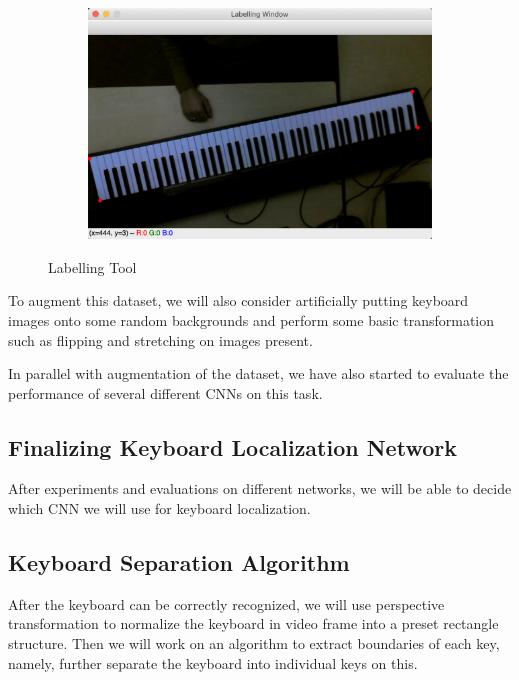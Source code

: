 \documentclass[10pt,twocolumn,letterpaper]{article}
\begin{document}
\begin{figure}[h!]
  \hspace{2.1cm}
  \begin{subfigure}{0.24\textwidth}
    \includegraphics[width=\linewidth]{fig/7.png}
  \end{subfigure}
  \caption{Labelling Tool}
\end{figure}

To augment this dataset, we will also consider artificially putting keyboard images onto some random backgrounds and perform some basic transformation such as flipping and stretching on images present.

In parallel with augmentation of the dataset, we have also started to evaluate the performance of several different CNNs on this task.

\subsection{Finalizing Keyboard Localization Network}

After experiments and evaluations on different networks, we will be able to decide which CNN we will use for keyboard localization.

\subsection{Keyboard Separation Algorithm}

After the keyboard can be correctly recognized, we will use perspective transformation to normalize the keyboard in video frame into a preset rectangle structure. Then we will work on an algorithm to extract boundaries of each key, namely, further separate the keyboard into individual keys on this.
\end{document}
